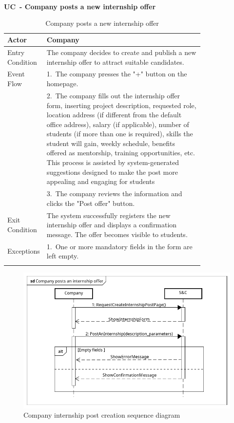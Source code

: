 \textbf{UC\cuc\  - Company posts a new internship offer}

\begin{center} 
    \renewcommand{\arraystretch}{1.2} 
    \begin{longtable}{ l p{0.8\linewidth} } 
        \hline 
        Actor & Company \\ \hline 
        Entry Condition & The company decides to create and publish a new internship offer to attract suitable candidates. \\ \hline Event Flow & 1.\ The company presses the "+" button on the homepage. \\ 
        & 2.\ The company fills out the internship offer form, inserting project description, requested role, location address (if different from the default office address), salary (if applicable), number of students (if more than one is required), skills the student will gain, weekly schedule, benefits offered as mentorship, training opportunities, etc. This process is assisted by system-generated suggestions designed to make the post more appealing and engaging for students \\ 
        & 3.\ The company reviews the information and clicks the "Post offer" button. \\ \hline 
        Exit Condition & The system successfully registers the new internship offer and displays a confirmation message. The offer becomes visible to students. \\ \hline 
        Exceptions & 1.\ One or more mandatory fields in the form are left empty.\\ \hline 
        \caption{Company posts a new internship offer} 
        \label{tab:company_post_offer_uc} 
    \end{longtable} 
\end{center}

\begin{figure}[H]
    \centering
    \includegraphics[width=1\linewidth]{Images/Sequence diagrams/Company posts an internship offer.png}
    \caption{Company internship post creation sequence diagram}
    \label{fig:enter-label}
\end{figure}

